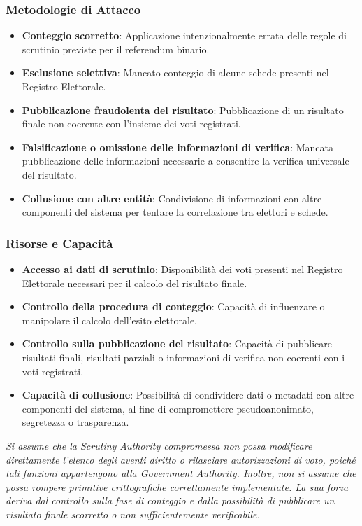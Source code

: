 \documentclass[a4paper,12pt]{article}
\begin{document}
\subsubsection*{Metodologie di Attacco}

\begin{itemize}
    \item \textbf{Conteggio scorretto}: Applicazione intenzionalmente errata delle regole di scrutinio previste per il referendum binario.

    \item \textbf{Esclusione selettiva}: Mancato conteggio di alcune schede presenti nel Registro Elettorale.

    \item \textbf{Pubblicazione fraudolenta del risultato}: Pubblicazione di un risultato finale non coerente con l'insieme dei voti registrati.

    \item \textbf{Falsificazione o omissione delle informazioni di verifica}: Mancata pubblicazione delle informazioni necessarie a consentire la verifica universale del risultato.

    \item \textbf{Collusione con altre entità}: Condivisione di informazioni con altre componenti del sistema per tentare la correlazione tra elettori e schede.
\end{itemize}

\subsubsection*{Risorse e Capacità}

\begin{itemize}
    \item \textbf{Accesso ai dati di scrutinio}: Disponibilità dei voti presenti nel Registro Elettorale necessari per il calcolo del risultato finale.

    \item \textbf{Controllo della procedura di conteggio}: Capacità di influenzare o manipolare il calcolo dell'esito elettorale.

    \item \textbf{Controllo sulla pubblicazione del risultato}: Capacità di pubblicare risultati finali, risultati parziali o informazioni di verifica non coerenti con i voti registrati.

    \item \textbf{Capacità di collusione}: Possibilità di condividere dati o metadati con altre componenti del sistema, al fine di compromettere pseudoanonimato, segretezza o trasparenza.
\end{itemize}
\textit{Si assume che la Scrutiny Authority compromessa non possa modificare direttamente l'elenco degli aventi diritto o rilasciare autorizzazioni di voto, poiché tali funzioni appartengono alla Government Authority. Inoltre, non si assume che possa rompere primitive crittografiche correttamente implementate. La sua forza deriva dal controllo sulla fase di conteggio e dalla possibilità di pubblicare un risultato finale scorretto o non sufficientemente verificabile.}
\end{document}

